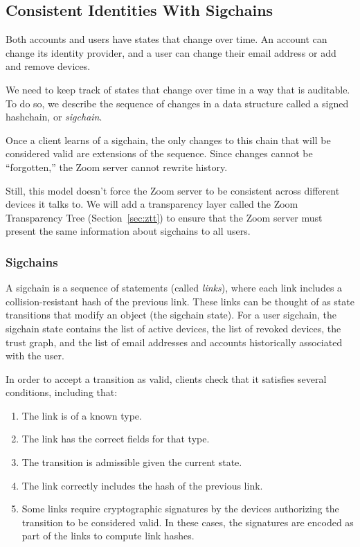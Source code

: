 \subsection{Consistent Identities With Sigchains}
\label{subsec:sigchains}

Both accounts and users have states that change over time. An account can change its identity
provider, and a user can change their email address or add and remove devices.

We need to keep track of states that change over time in a way that is auditable. To do so, we
describe the sequence of changes in a data structure called a signed hashchain, or
\textit{sigchain}.

Once a client learns of a sigchain, the only changes to this chain that will be considered valid are
extensions of the sequence. Since changes cannot be ``forgotten,'' the Zoom server cannot rewrite
history.

Still, this model doesn't force the Zoom server to be consistent across different devices it talks
to. We will add a transparency layer called the Zoom Transparency Tree (Section~\ref{sec:ztt}) to
ensure that the Zoom server must present the same information about sigchains to all users.

\subsubsection{Sigchains}

A sigchain is a sequence of statements (called \textit{links}), where each link includes a
collision-resistant hash of the previous link. These links can be thought of as state transitions
that modify an object (the sigchain state). For a user sigchain, the sigchain state contains the
list of active devices, the list of revoked devices, the trust graph, and the list of email
addresses and accounts historically associated with the user.

In order to accept a transition as valid, clients check that it satisfies several conditions,
including that:

\begin{enumerate}
\item The link is of a known type.
\item The link has the correct fields for that type.
\item The transition is admissible given the current state.
\item The link correctly includes the hash of the previous link.
\item Some links require cryptographic signatures by the devices authorizing the transition to be
    considered valid. In these cases, the signatures are encoded as part of the links to compute
    link hashes.
\end{enumerate}

